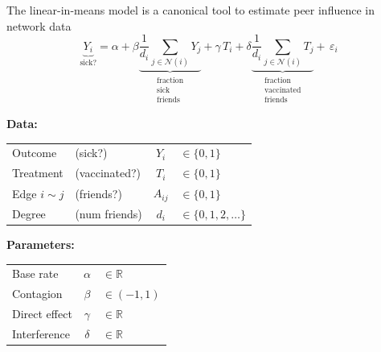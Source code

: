\documentclass[final]{beamer}
\newcommand{\Ni}{\mathcal N(i)}
\newcommand{\R}{\mathbb{R}}
\newlength{\colwidth}
\begin{document}
\begin{frame}[t]
\begin{columns}[t]
\begin{column}{\colwidth}
            \begin{block}{The linear-in-means model is a canonical tool to estimate peer influence in network data}
                \begin{equation*}
                    \underbrace{Y_i}_\text{sick?} =
                    \alpha +
                    \beta \underbrace{\frac{1}{d_i}\sum_{j \in \Ni} Y_j}_{\substack{\text{fraction} \\ \text{sick} \\ \text{friends}}} +
                    \gamma \, T_i +
                    \delta \underbrace{\frac{1}{d_i}\sum_{j \in \Ni} T_j}_{\substack{\text{fraction} \\ \text{vaccinated} \\ \text{friends}}} + \,
                    \varepsilon_i
                \end{equation*}
                \begin{minipage}{.5\textwidth}
                    \textbf{Data:}
                    \vspace{3mm}
                    \begin{table}[]
                        \begin{tabular}{llcl}
                            Outcome         & (sick?)       & $Y_i$    & $\in \{0, 1\}$           \\
                            Treatment       & (vaccinated?) & $T_i$    & $\in \{0, 1\}$           \\
                            Edge $i \sim j$ & (friends?)    & $A_{ij}$ & $\in \{0, 1\}$           \\
                            Degree          & (num friends) & $d_i$    & $\in \{0, 1, 2, \dots\}$
                        \end{tabular}
                    \end{table}
                \end{minipage}
                \begin{minipage}{.5\textwidth}
                    \textbf{Parameters:}
                    \vspace{3mm}
                    \begin{table}[]
                        \begin{tabular}{lcl}
                            Base rate     & $\alpha$ & $\in \R$      \\
                            Contagion     & $\beta$  & $\in (-1, 1)$ \\
                            Direct effect & $\gamma$ & $\in \R$      \\
                            Interference  & $\delta$ & $\in \R$
                        \end{tabular}
                    \end{table}
                \end{minipage}


\end{block}
\end{column}
\end{columns}
\end{frame}
\end{document}
